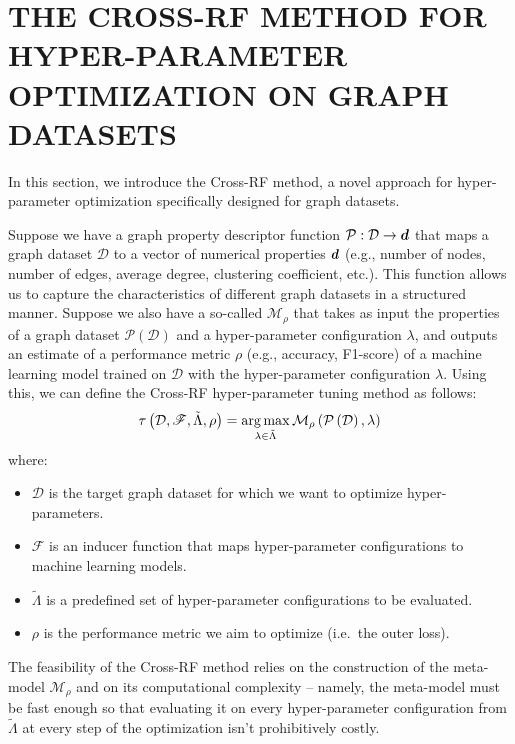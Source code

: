 \section{\uppercase{The Cross-RF Method for Hyper-Parameter Optimization on Graph Datasets}}

In this section, we introduce the Cross-RF method, a novel approach for hyper-parameter optimization specifically designed for graph datasets.

Suppose we have a graph property descriptor function \( \mathcal{P}: \mathcal{D} \rightarrow \boldsymbol{d} \) that maps a graph dataset \( \mathcal{D} \) to a vector of numerical properties \( \boldsymbol{d} \) (e.g., number of nodes, number of edges, average degree, clustering coefficient, etc.). This function allows us to capture the characteristics of different graph datasets in a structured manner. Suppose we also have a so-called  \( \mathcal{M}_\rho \) that takes as input the properties of a graph dataset \( \mathcal{P} \left( \mathcal{D} \right) \) and a hyper-parameter configuration \( \lambda \), and outputs an estimate of a performance metric \( \rho \) (e.g., accuracy, F1-score) of a machine learning model trained on \( \mathcal{D} \) with the hyper-parameter configuration \( \lambda \). Using this, we can define the Cross-RF hyper-parameter tuning method as follows:
\begin{equation*}
	\tau \left( \mathcal{D}, \mathscr{F}, \tilde{\Lambda}, \rho \right) = \operatorname*{arg\,max}_{\lambda \in \tilde{\Lambda}} \mathcal{M}_\rho \left( \mathcal{P} \left( \mathcal{D} \right), \lambda \right)
\end{equation*}
where:
\begin{itemize}
	\item \( \mathcal{D} \) is the target graph dataset for which we want to optimize hyper-parameters.
	\item \( \mathscr{F} \) is an inducer function that maps hyper-parameter configurations to machine learning models.
	\item \( \tilde{\Lambda} \) is a predefined set of hyper-parameter configurations to be evaluated.
	\item \( \rho \) is the performance metric we aim to optimize (i.e.\ the outer loss).
\end{itemize}
The feasibility of the Cross-RF method relies on the construction of the meta-model \( \mathcal{M}_\rho \) and on its computational complexity -- namely, the meta-model must be fast enough so that evaluating it on every hyper-parameter configuration from \( \tilde{\Lambda} \) at every step of the optimization isn't prohibitively costly.

